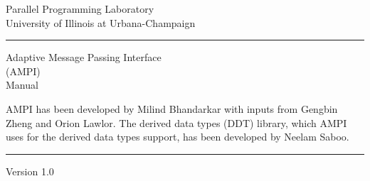 \documentclass[11pt]{article}
\begin{document}
\begin{titlepage}
\begin{flushright}
{\Large 
  Parallel Programming Laboratory\\
  University of Illinois at Urbana-Champaign\\
}
\end{flushright}
\rule{\textwidth}{3pt}
\vspace{\fill}
\begin{flushright}
\textsf{
 {\Huge Adaptive Message Passing Interface\\ (AMPI)\\ Manual \\}
}
\end{flushright}
\vspace{\fill}

AMPI has been developed by Milind Bhandarkar with inputs from Gengbin Zheng and
Orion Lawlor. The derived data types (DDT) library, which AMPI uses for the
derived data types support, has been developed by Neelam Saboo.

\rule{\textwidth}{3pt}

\begin{flushright}
{\large Version 1.0}
\end{flushright}
\end{titlepage}

\tableofcontents
\newpage


\end{document}
